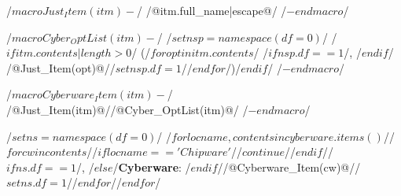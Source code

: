 /$ macro Just_Item(itm) -$/       
/@itm.full_name|escape@/
/$- endmacro $/

/$ macro Cyber_OptList(itm) -$/
/$set nsp=namespace(df=0)$/
/$if itm.contents|length > 0$/
 (/$for opt in itm.contents$/
/$if nsp.df==1$/, /$endif$/
/@Just_Item(opt)@//$set nsp.df=1$//$endfor$/)/$endif$/
/$- endmacro $/

/$ macro Cyberware_Item(itm) -$/
/@Just_Item(itm)@//@Cyber_OptList(itm)@/
/$- endmacro $/

/$set ns=namespace(df=0)$/
/$for locname, contents in cyberware.items()$//$for cw in contents$//$if locname=='Chipware'$//$continue$//$endif$//$if ns.df==1$/, /$else$/\textbf{Cyberware}: /$endif$//@Cyberware_Item(cw)@//$set ns.df=1$//$endfor$//$endfor$/